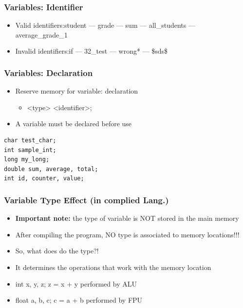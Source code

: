 \documentclass{../c-lecture}
\begin{document}
\begin{frame}
  \frametitle{Variables: Identifier}
  \begin{itemize}
    \item Valid identifiers:\@ student --- grade --- sum --- all\_students --- average\_grade\_1
    \item Invalid identifiers:\@ if --- 32\_test --- wrong* --- \$sds\$
  \end{itemize}
\end{frame}

\begin{frame}[fragile]
  \frametitle{Variables: Declaration}
  \begin{itemize}
    \item
      Reserve memory for variable:
      {\color{Orange} declaration}
    \begin{itemize}
      \item <type> <identifier>;
    \end{itemize}
    \item
      A variable must be declared {\color{LimeGreen} before} use
  \end{itemize}
  \begin{verbatim}
char test_char;
int sample_int;
long my_long;
double sum, average, total;
int id, counter, value;
  \end{verbatim}
\end{frame}

\begin{frame}
  \frametitle{Variable Type Effect (in complied Lang.)}
  \begin{itemize}
    \item \textbf{\color{Orange} Important note:} the type of variable is
      NOT stored in the main memory
    \item After compiling the program, NO type is associated to memory locations!!!
  \end{itemize}
  \begin{itemize}
    \item So, what does do the type?!
    \item
      It determines the {\color{Green} operations} that work
      with the memory location
  \end{itemize}
  \begin{itemize}
    \item
      int x, y, z; z = x + y performed by {\color{Cyan} ALU}
    \item
      float a, b, c; c = a + b performed by {\color{Cyan} FPU}
  \end{itemize}
\end{frame}
\end{document}
